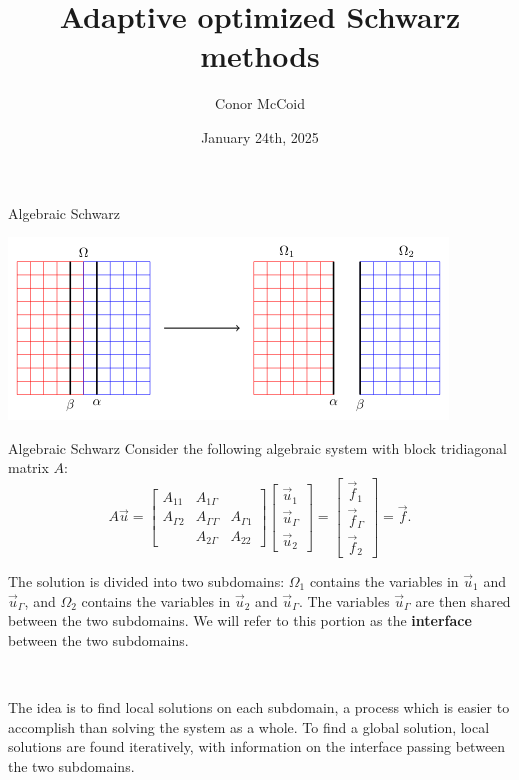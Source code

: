 \documentclass{beamer}
\title{Adaptive optimized Schwarz methods}
\author{Conor McCoid}
\institute{McMaster University}
\date{January 24th, 2025}
\begin{document}
\maketitle

\begin{frame}{Algebraic Schwarz}

\includegraphics[width=\textwidth]{AOSM/TIKZ_AOSM_20230614_1.png}
\end{frame}

\begin{frame}{Algebraic Schwarz}
Consider the following algebraic system with block tridiagonal matrix $A$:
\begin{equation*}
	A \vec{u} = \begin{bmatrix} A_{11} & A_{1 \Gamma} \\ A_{\Gamma 2} & A_{\Gamma \Gamma} & A_{\Gamma 1} \\ ~ & A_{2 \Gamma} & A_{22} \end{bmatrix} \begin{bmatrix} \vec{u}_1 \\ \vec{u}_\Gamma \\ \vec{u}_2 \end{bmatrix} = \begin{bmatrix} \vec{f}_1 \\ \vec{f}_\Gamma \\ \vec{f}_2 \end{bmatrix} = \vec{f} .
\end{equation*}

The solution is divided into two subdomains: $\Omega_1$ contains the variables in $\vec{u}_1$ and $\vec{u}_\Gamma$, and $\Omega_2$ contains the variables in $\vec{u}_2$ and $\vec{u}_\Gamma$.
The variables $\vec{u}_\Gamma$ are then shared between the two subdomains.
We will refer to this portion as the \textbf{interface} between the two subdomains.

~

The idea is to find local solutions on each subdomain, a process which is easier to accomplish than solving the system as a whole.
To find a global solution, local solutions are found iteratively, with information on the interface passing between the two subdomains.
\end{frame}
\end{document}
